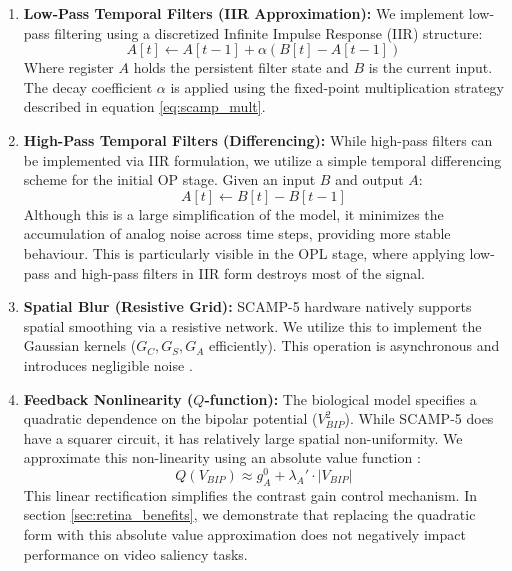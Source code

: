 \documentclass{article}
\begin{document}
\begin{enumerate}
    \item \textbf{Low-Pass Temporal Filters (IIR Approximation):}
    We implement low-pass filtering using a discretized Infinite Impulse Response (IIR) structure:
    \begin{equation}
        A[t] \leftarrow A[t-1] + \alpha (B[t] - A[t-1])
        \label{eq:lpf}
    \end{equation}
    Where register $A$ holds the persistent filter state and $B$ is the current input. The decay coefficient $\alpha$ is applied using the fixed-point multiplication strategy described in equation \ref{eq:scamp_mult}.
    \item \textbf{High-Pass Temporal Filters (Differencing):}
    While high-pass filters can be implemented via IIR formulation, we utilize a simple temporal differencing scheme for the initial OP stage. Given an input $B$ and output $A$:
    \begin{equation}
        A[t] \leftarrow B[t] - B[t-1]
        \label{eq:hpf}
    \end{equation}
    Although this is a large simplification of the model, it minimizes the accumulation of analog noise across time steps, providing more stable behaviour. This is particularly visible in the OPL stage, where applying low-pass and high-pass filters in IIR form destroys most of the signal.
    \item \textbf{Spatial Blur (Resistive Grid):}
    SCAMP-5 hardware natively supports spatial smoothing via a resistive network. We utilize this to implement the Gaussian kernels ($G_C, G_S, G_A$ efficiently). This operation is asynchronous and introduces negligible noise \cite{carey_100000_2013}.

    \item \textbf{Feedback Nonlinearity ($Q$-function):}
    The biological model specifies a quadratic dependence on the bipolar potential ($V_{BIP}^2$). While SCAMP-5 does have a squarer circuit, it has relatively large spatial non-uniformity. We approximate this non-linearity using an absolute value function : 
    \begin{equation}
        Q(V_{BIP}) \approx g_{A}^0 + \lambda_A' \cdot |V_{BIP}|
        \label{eq:feedback_relaxed}
    \end{equation}
    This linear rectification simplifies the contrast gain control mechanism. In section \ref{sec:retina_benefits}, we demonstrate that replacing the quadratic form with this absolute value approximation does not negatively impact performance on video saliency tasks.


\end{enumerate}
\end{document}
